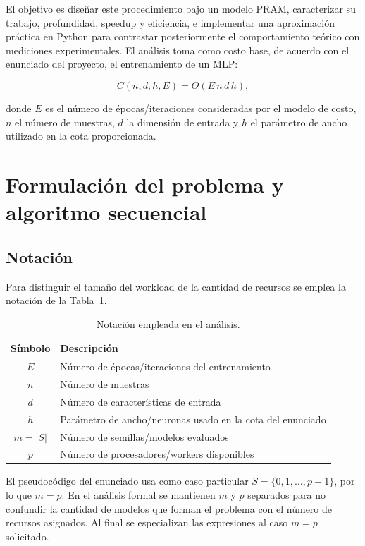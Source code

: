 \documentclass[11pt,a4paper]{article}
\newcommand{\Cost}{C}
\begin{document}
El objetivo es diseñar este procedimiento bajo un modelo PRAM, caracterizar su trabajo,
profundidad, speedup y eficiencia, e implementar una aproximación práctica en Python
para contrastar posteriormente el comportamiento teórico con mediciones experimentales.
El análisis toma como costo base, de acuerdo con el enunciado del proyecto, el
entrenamiento de un MLP:

\begin{equation}
    \Cost(n,d,h,E)=\Theta(E\,n\,d\,h),
    \label{eq:costo-modelo}
\end{equation}

donde $E$ es el número de épocas/iteraciones consideradas por el modelo de costo,
$n$ el número de muestras, $d$ la dimensión de entrada y $h$ el parámetro de ancho
utilizado en la cota proporcionada.

\section{Formulación del problema y algoritmo secuencial}

\subsection{Notación}

Para distinguir el tamaño del workload de la cantidad de recursos se emplea la
notación de la Tabla~\ref{tab:notacion}.

\begin{table}[H]
\centering
\begin{tabular}{cl}
\toprule
Símbolo & Descripción \\
\midrule
$E$ & Número de épocas/iteraciones del entrenamiento \\
$n$ & Número de muestras \\
$d$ & Número de características de entrada \\
$h$ & Parámetro de ancho/neuronas usado en la cota del enunciado \\
$m=|S|$ & Número de semillas/modelos evaluados \\
$p$ & Número de procesadores/workers disponibles \\
\bottomrule
\end{tabular}
\caption{Notación empleada en el análisis.}
\label{tab:notacion}
\end{table}

El pseudocódigo del enunciado usa como caso particular
$S=\{0,1,\ldots,p-1\}$, por lo que $m=p$. En el análisis formal se mantienen
$m$ y $p$ separados para no confundir la cantidad de modelos que forman el problema
con el número de recursos asignados. Al final se especializan las expresiones al caso
$m=p$ solicitado.
\end{document}
